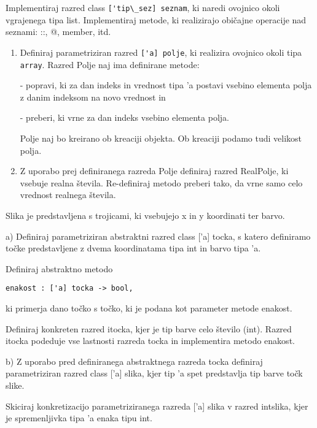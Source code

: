 \begin{ex}
Implementiraj razred class \lstinline{['tip\_sez] seznam}, ki naredi ovojnico okoli vgrajenega tipa list. Implementiraj metode, ki realizirajo obi\v cajne operacije nad seznami: ::, @, member, itd.



\end{ex}
\begin{ex}

\begin{enumerate}
\item Definiraj parametriziran razred \lstinline{['a] polje}, ki realizira ovojnico okoli tipa \lstinline{array}. Razred Polje naj ima definirane metode:

- popravi, ki za dan indeks in vrednost tipa 'a postavi vsebino elementa polja z danim indeksom na novo vrednost in

- preberi, ki vrne za dan indeks vsebino elementa polja. 

Polje naj bo kreirano ob kreaciji objekta. Ob kreaciji podamo tudi velikost polja.

\item Z uporabo prej definiranega razreda Polje definiraj razred RealPolje, ki vsebuje realna \v stevila. Re-definiraj metodo preberi tako, da vrne samo celo vrednost realnega \v stevila.
\end{enumerate}



\end{ex}
\begin{ex}
Slika je predstavljena s trojicami, ki vsebujejo x in y koordinati ter barvo.

a) Definiraj parametriziran abstraktni razred class ['a] tocka, s katero definiramo to\v cke predstavljene z dvema koordinatama tipa int in barvo tipa 'a. 

Definiraj abstraktno metodo 
\begin{lstlisting}
enakost : ['a] tocka -> bool, 
\end{lstlisting}
ki primerja dano to\v cko s to\v cko, ki je podana kot parameter metode enakost. 

Definiraj konkreten razred itocka, kjer je tip barve celo \v stevilo (int). Razred itocka podeduje vse lastnosti razreda tocka in implementira metodo enakost.

b) Z uporabo pred definiranega abstraktnega razreda tocka definiraj parametriziran razred class ['a] slika, kjer tip 'a spet predstavlja tip barve to\v ck slike. 

Skiciraj konkretizacijo parametriziranega razreda ['a] slika v razred intslika, kjer je spremenljivka tipa 'a enaka tipu int.
\end{ex}
